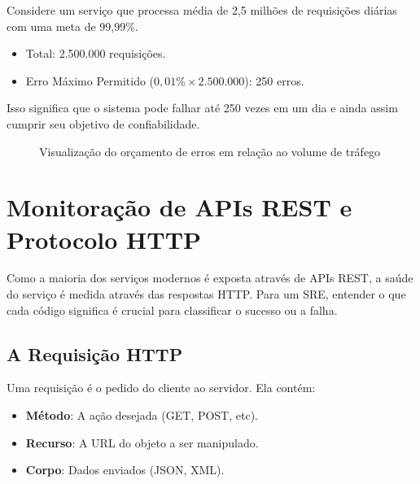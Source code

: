 \documentclass[12pt,a4paper,twoside]{report}
\begin{document}
Considere um serviço que processa média de 2,5 milhões de requisições diárias com uma meta de 99,99\%.

\begin{itemize}
    \item Total: 2.500.000 requisições.
    \item Erro Máximo Permitido ($0,01\% \times 2.500.000$): 250 erros.
\end{itemize}

Isso significa que o sistema pode falhar até 250 vezes em um dia e ainda assim cumprir seu objetivo de confiabilidade.

\begin{figure}[h]
    \centering
    \caption{Visualização do orçamento de erros em relação ao volume de tráfego}
\end{figure}

\section{Monitoração de APIs REST e Protocolo HTTP}

Como a maioria dos serviços modernos é exposta através de APIs REST, a saúde do serviço é medida através das respostas HTTP. Para um SRE, entender o que cada código significa é crucial para classificar o sucesso ou a falha.

\subsection{A Requisição HTTP}

Uma requisição é o pedido do cliente ao servidor. Ela contém:
\begin{itemize}
    \item \textbf{Método}: A ação desejada (GET, POST, etc).
    \item \textbf{Recurso}: A URL do objeto a ser manipulado.
    \item \textbf{Corpo}: Dados enviados (JSON, XML).
\end{itemize}
\end{document}
